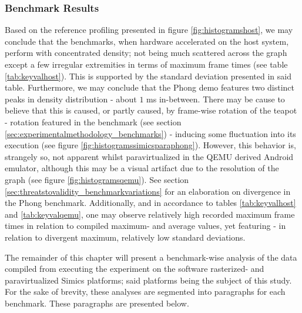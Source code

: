 \subsubsection{Benchmark Results}
\label{sec:results_benchmarkresults}
Based on the reference profiling presented in figure \ref{fig:histogramshost}, we may conclude that the benchmarks, when hardware accelerated on the host system, perform with concentrated density; not being much scattered across the graph except a few irregular extremities in terms of maximum frame times (see table \ref{tab:keyvalhost}).
This is supported by the standard deviation presented in said table.
Furthermore, we may conclude that the Phong demo features two distinct peaks in density distribution - about $1$ ms in-between.
There may be cause to believe that this is caused, or partly caused, by frame-wise rotation of the teapot - rotation featured in the benchmark (see section \ref{sec:experimentalmethodology_benchmarks}) - inducing some fluctuation into its execution (see figure \ref{fig:histogramssimicsparaphong}).
However, this behavior is, strangely so, not apparent whilst paravirtualized in the QEMU derived Android emulator, although this may be a visual artifact due to the resolution of the graph (see figure \ref{fig:histogramsqemu}).
See section \ref{sec:threatstovalidity_benchmarkvariations} for an elaboration on divergence in the Phong benchmark.
Additionally, and in accordance to tables \ref{tab:keyvalhost} and \ref{tab:keyvalqemu}, one may observe relatively high recorded maximum frame times in relation to compiled maximum- and average values, yet featuring - in relation to divergent maximum, relatively low standard deviations.

The remainder of this chapter will present a benchmark-wise analysis of the data compiled from executing the experiment on the software rasterized- and paravirtualized Simics platforms; said platforms being the subject of this study.
For the sake of brevity, these analyses are segmented into paragraphs for each benchmark.
These paragraphs are presented below.

\providecommand{\chesskeyone}{$60\times60$ tiles}
\providecommand{\chesskeytwo}{$84\times84$ tiles}
\providecommand{\chesskeythree}{$118\times118$ tiles}

\providecommand{\juliakeyone}{$225$ iterations}
\providecommand{\juliakeytwo}{$450$ iterations}
\providecommand{\juliakeythree}{$900$ iterations}

